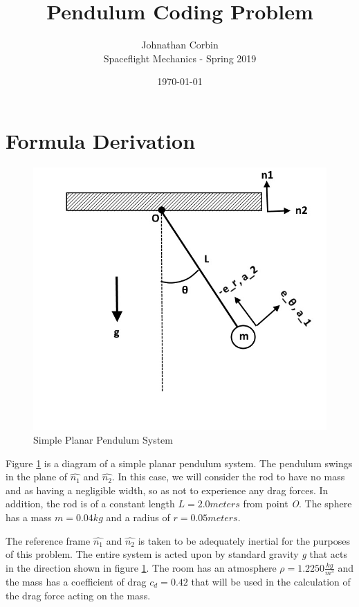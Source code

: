 \documentclass{article}
\begin{document}
    \title{Pendulum Coding Problem}    
    \author{Johnathan Corbin\\Spaceflight Mechanics - Spring 2019}   
    \date{\today}
    \maketitle
\pagebreak

\tableofcontents
\pagebreak

\section{Formula Derivation}

\begin{figure}[h]
\centering
\includegraphics[width=1\textwidth]{figure1}
\caption{Simple Planar Pendulum System}
\label{figure1}
\end{figure}

	Figure \ref{figure1} is a diagram of a simple planar pendulum system. The pendulum swings in the plane of $\hat{n_1}$ and $\hat{n_2}$. In this case, we will consider the rod to have no mass and as having a negligible width, so as not to experience any drag forces. In addition, the rod is of a constant length $L = 2.0 meters$ from point \textit{O}. The sphere has a mass $m = 0.04kg$ and a radius of $r = 0.05 meters$.
	
	The reference frame $\hat{n_1}$ and $\hat{n_2}$ is taken to be adequately inertial for the purposes of this problem. The entire system is acted upon by standard gravity \textit{g} that acts in the direction shown in figure \ref{figure1}. The room has an atmosphere $\rho = 1.2250 \frac{kg}{m^3}$ and the mass has a coefficient of drag $c_d = 0.42$ that will be used in the calculation of the drag force acting on the mass. 
\end{document}
